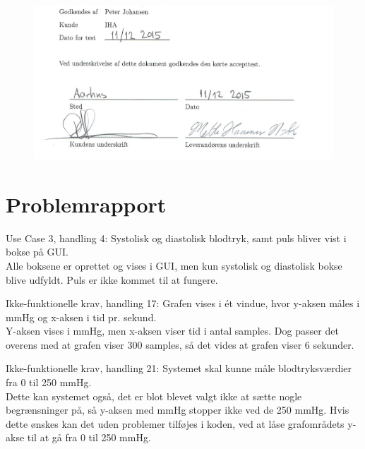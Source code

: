 \begin{figure}[H]
	\centering
	\includegraphics[width=1.0\textwidth]{Figurer/UnderskriftAT}
\end{figure}



\newpage
\section{Problemrapport}
Use Case 3, handling 4: Systolisk og diastolisk blodtryk, samt puls bliver vist i bokse på GUI. \\ 
Alle boksene er oprettet og vises i GUI, men kun systolisk og diastolisk bokse blive udfyldt. Puls er ikke kommet til at fungere. 

Ikke-funktionelle krav, handling 17: Grafen vises i ét vindue, hvor y-aksen måles i mmHg og x-aksen i tid pr. sekund.\\
Y-aksen vises i mmHg, men x-aksen viser tid i antal samples. Dog passer det overens med at grafen viser 300 samples, så det vides at grafen viser 6 sekunder.  

Ikke-funktionelle krav, handling 21: Systemet skal kunne måle blodtryksværdier fra 0 til 250 mmHg. \\
Dette kan systemet også, det er blot blevet valgt ikke at sætte nogle begrænsninger på, så y-aksen med mmHg stopper ikke ved de 250 mmHg. Hvis dette ønskes kan det uden problemer tilføjes i koden, ved at låse grafområdets y-akse til at gå fra 0 til 250 mmHg.  